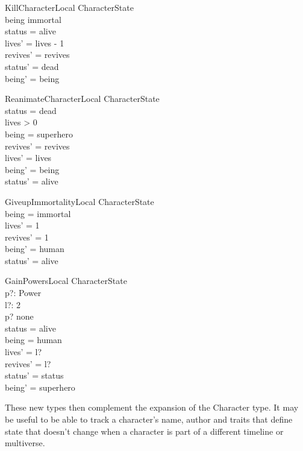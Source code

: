 \documentclass{article}
\begin{document}
\begin{schema}{KillCharacterLocal} 
\Delta CharacterState \\
\where
being \neq immortal \\
status = alive \\
lives' = lives - 1 \\
revives' = revives \\
status' = dead \\
being' = being \\
\end{schema}
  
\begin{schema}{ReanimateCharacterLocal}
\Delta CharacterState \\
\where
status = dead \\
lives > 0 \\
being = superhero \\
revives' = revives \\
lives' = lives \\
being' = being \\
status' = alive \\
\end{schema}

\begin{schema}{GiveupImmortalityLocal}
\Delta CharacterState \\
\where
being = immortal \\
lives' = 1 \\
revives' = 1 \\
being' = human \\
status' = alive \\
\end{schema}

\begin{schema}{GainPowersLocal}
\Delta CharacterState \\
p?: Power \\
l?: 2  \\
\where
p? \neq none \\
status = alive \\
being = human \\
lives' = l? \\
revives' = l? \\
status' = status \\
being' = superhero \\
\end{schema}

These new types then complement the expansion of the Character type. It may be useful to be able to track a character’s name, author and traits that define state that doesn’t change when a character is part of a different timeline or multiverse.  \\
\end{document}

